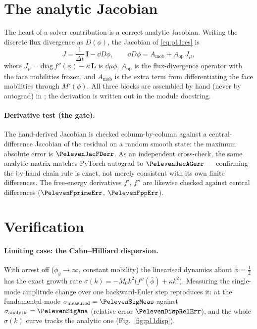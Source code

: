 \section{The analytic Jacobian}

The heart of a solver contribution is a correct analytic Jacobian. Writing the
discrete flux divergence as $D(\phi)$, the Jacobian of \eqref{eq:p11res} is
\begin{equation}
  J = \frac{1}{\Delta t}\,\mathbf{I} - \dd{D}{\phi},\qquad
  \dd{D}{\phi} = A_{\mathrm{mob}} + A_{\mathrm{op}}\,J_\mu,
  \label{eq:p11jac}
\end{equation}
where $J_\mu = \mathrm{diag}\,f''(\phi) - \kappa\,\mathbf{L}$ is $\dd{\mu}{\phi}$,
$A_{\mathrm{op}}$ is the flux-divergence operator with the face mobilities
frozen, and $A_{\mathrm{mob}}$ is the extra term from differentiating the face
mobilities through $M'(\phi)$. All three blocks are assembled by hand (never by
autograd) in ; the derivation is written out in the module
docstring.

\paragraph{Derivative test (the gate).} The hand-derived Jacobian is checked
column-by-column against a central-difference Jacobian of the residual on a
random smooth state: the maximum absolute error is $\PelevenJacFDerr$. As an
independent cross-check, the same analytic matrix matches PyTorch autograd to
$\PelevenJacAGerr$ --- confirming the by-hand chain rule is exact, not merely
consistent with its own finite differences. The free-energy derivatives $f'$,
$f''$ are likewise checked against central differences ($\PelevenFprimeErr$,
$\PelevenFppErr$).

\section{Verification}

\paragraph{Limiting case: the Cahn--Hilliard dispersion.} With arrest off
($\phi_g\to\infty$, constant mobility) the linearised dynamics about
$\bar\phi=\tfrac12$ has the exact growth rate
$\sigma(k) = -M_0 k^2\big(f''(\bar\phi)+\kappa k^2\big)$. Measuring the
single-mode amplitude change over one backward-Euler step reproduces it: at the
fundamental mode $\sigma_{\text{measured}}=\PelevenSigMeas$ against
$\sigma_{\text{analytic}}=\PelevenSigAna$ (relative error $\PelevenDispRelErr$),
and the whole $\sigma(k)$ curve tracks the analytic one
(Fig.~\ref{fig:p11disp}).

